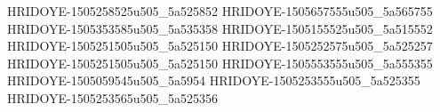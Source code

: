 HRIDOYE-1505258525u505_5a525852
HRIDOYE-1505657555u505_5a565755
HRIDOYE-1505353585u505_5a535358
HRIDOYE-1505155525u505_5a515552
HRIDOYE-1505251505u505_5a525150
HRIDOYE-1505252575u505_5a525257
HRIDOYE-1505251505u505_5a525150
HRIDOYE-1505553555u505_5a555355
HRIDOYE-1505059545u505_5a5954
HRIDOYE-1505253555u505_5a525355
HRIDOYE-1505253565u505_5a525356
